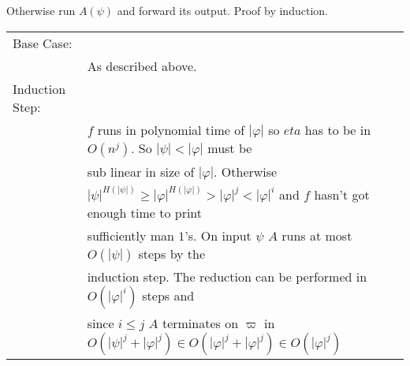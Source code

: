 \documentclass[10pt]{article}
\begin{document}
    Otherwise run $A(\psi)$ and forward its output. Proof by induction.

      \begin{tabular}{l l}
        Base Case: & \\
                  & As described above. \\
        Induction Step: & \\
                  & $f$ runs in polynomial time of $|\varphi|$ so $eta$ has to
                  be in $O(n^j)$. So $|\psi|<|\varphi|$ must be\\ &
                  sub linear in size of $|\varphi|$. Otherwise \\ & 
                  $|\psi|^{H(|\psi|)}\geq
                  |\varphi|^{H(|\varphi|)}>|\varphi|^j<|\varphi|^i$
                  and $f$ hasn't got enough time to print \\ &
                  sufficiently man $1$'s. On input $\psi$
                  $A$ runs at most $O(|\psi|)$ steps by the \\ &
                  induction step. The reduction can be performed in 
                  $O(|\varphi|^i)$ steps and \\ &
                  since $i\leq j$ $A$ terminates on $\varpi$ in
                  $O(|\psi|^j+|\varphi|^j)\in O(|\varphi|^j+|\varphi|^j) \in
                  O(|\varphi|^j)$
      \end{tabular}
\end{document}

